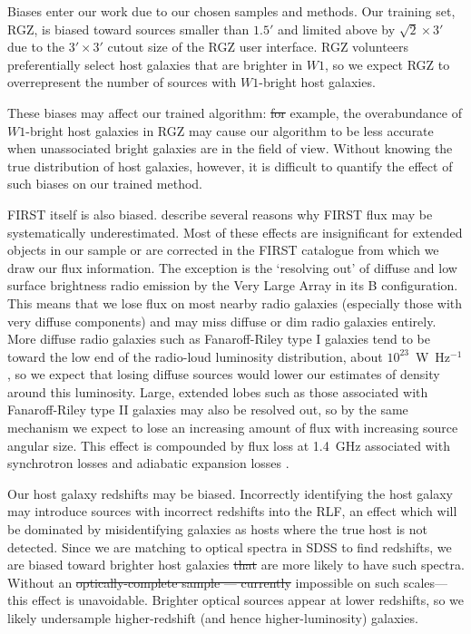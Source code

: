\documentclass[11pt, a4paper]{book}
\providecommand{\DIFaddtex}[1]{{\protect\color{blue}\uwave{#1}}} %
\providecommand{\DIFdeltex}[1]{{\protect\color{red}\sout{#1}}}                      %
\providecommand{\DIFaddbegin}{} %
\providecommand{\DIFaddend}{} %
\providecommand{\DIFdelbegin}{} %
\providecommand{\DIFdelend}{} %
\providecommand{\DIFadd}[1]{\texorpdfstring{\DIFaddtex{#1}}{#1}} %
\providecommand{\DIFdel}[1]{\texorpdfstring{\DIFdeltex{#1}}{}} %
\newcommand{\DIFscaledelfig}{0.5}
\newlength{\DIFdelgraphicswidth} %
\newlength{\DIFdelgraphicsheight} %
\newcommand{\DIFaddincludegraphics}[2][]{{\color{blue}\fbox{\DIFOincludegraphics[#1]{#2}}}} %
\newcommand{\DIFdelincludegraphics}[2][]{%
\sbox{\DIFdelgraphicsbox}{\DIFOincludegraphics[#1]{#2}}%
\settoboxwidth{\DIFdelgraphicswidth}{\DIFdelgraphicsbox} %
\settoboxtotalheight{\DIFdelgraphicsheight}{\DIFdelgraphicsbox} %
\scalebox{\DIFscaledelfig}{%
\parbox[b]{\DIFdelgraphicswidth}{\usebox{\DIFdelgraphicsbox}\\[-\baselineskip] \rule{\DIFdelgraphicswidth}{0em}}\llap{\resizebox{\DIFdelgraphicswidth}{\DIFdelgraphicsheight}{%
\setlength{\unitlength}{\DIFdelgraphicswidth}%
\begin{picture}(1,1)%
\thicklines\linethickness{2pt} %
{\color[rgb]{1,0,0}\put(0,0){\framebox(1,1){}}}%
{\color[rgb]{1,0,0}\put(0,0){\line( 1,1){1}}}%
{\color[rgb]{1,0,0}\put(0,1){\line(1,-1){1}}}%
\end{picture}%
}\hspace*{3pt}}} %
} %
\DeclareRobustCommand{\DIFaddbegin}{\DIFOaddbegin \let\includegraphics\DIFaddincludegraphics} %
\DeclareRobustCommand{\DIFaddend}{\DIFOaddend \let\includegraphics\DIFOincludegraphics} %
\DeclareRobustCommand{\DIFdelbegin}{\DIFOdelbegin \let\includegraphics\DIFdelincludegraphics} %
\DeclareRobustCommand{\DIFdelend}{\DIFOaddend \let\includegraphics\DIFOincludegraphics} %
\begin{document}
    Biases enter our work due to our chosen samples and methods. Our training set,
    RGZ, is biased toward sources smaller than $1.5'$ and limited above by $\sqrt{2}
    \times 3'$ due to the $3' \times 3'$ cutout size of the RGZ user
    interface. RGZ volunteers preferentially select host
    galaxies that are brighter in $W1$, so we expect RGZ to overrepresent
    the number of sources with $W1$-bright host galaxies.

    These biases may affect our
    trained algorithm: \DIFdelbegin \DIFdel{for }\DIFdelend \DIFaddbegin \DIFadd{For }\DIFaddend example, the overabundance of $W1$-bright host
    galaxies in RGZ may cause our algorithm to be less accurate when
    unassociated bright galaxies are in the field of view. Without knowing the true
    distribution of host galaxies, however, it is difficult to quantify the
    effect of such biases on our trained method.

    FIRST itself is also biased. \citet{helfand15first} describe several reasons why FIRST flux may be systematically underestimated. Most of these effects are insignificant for extended objects in our sample or are corrected in the FIRST catalogue from which we draw our flux information. The exception is the `resolving out' of diffuse and low surface brightness radio emission by the Very Large Array in its B configuration. This means that we lose flux on most nearby radio galaxies (especially those with very
    diffuse components) and may miss diffuse or dim radio galaxies entirely.
    More diffuse radio galaxies such as Fanaroff-Riley type I \citep[FRI;][]{fanaroff1974} galaxies tend to
    be toward the low end of the radio-loud luminosity distribution, about
    $10^{23}$~W~Hz$^{-1}$ \citep{best09radio}, so we expect that losing
    diffuse sources would lower our estimates of density around this
    luminosity. Large, extended lobes such as those associated with Fanaroff-Riley type II \citep[FRII;][]{fanaroff1974} galaxies may also be resolved out, so by the same mechanism we expect to lose an increasing amount of flux with increasing source angular size. This effect is compounded by flux loss at 1.4~GHz associated with synchrotron losses and adiabatic expansion losses \citep{blundell99doubles}.

    Our host galaxy redshifts may be biased. Incorrectly identifying the host galaxy may introduce sources with incorrect redshifts into the RLF, an effect which will be dominated by misidentifying galaxies as hosts where the true host is not detected. Since we are matching to optical spectra in SDSS to find
    redshifts, we are biased toward brighter host galaxies \DIFdelbegin \DIFdel{that }\DIFdelend \DIFaddbegin \DIFadd{which }\DIFaddend are more
    likely to have such spectra. Without an \DIFdelbegin \DIFdel{optically-complete sample ---
    currently }\DIFdelend \DIFaddbegin \DIFadd{optically complete sample---currently }\DIFaddend impossible on such scales---this effect is unavoidable.
    Brighter optical sources appear at lower redshifts, so we likely
    undersample higher-redshift (and hence higher-luminosity) galaxies.
\end{document}
